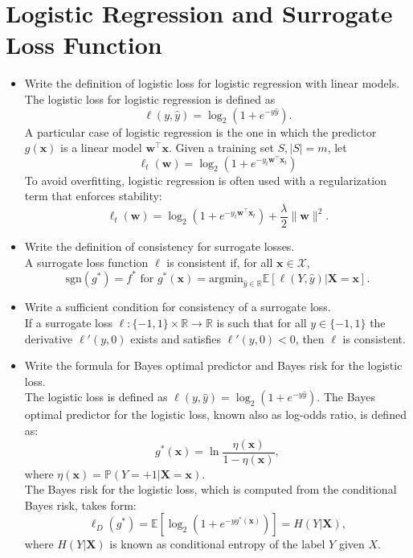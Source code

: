 \newpage
\section{Logistic Regression and Surrogate Loss Function}

\begin{itemize}

    \item Write the definition of logistic loss for logistic regression with linear models.\\

        The logistic loss for logistic regression is defined as
        $$\ell(y, \hat{y}) = \log_2 (1+e^{-y\hat{y}}).$$
        A particular case of logistic regression is the one in which the predictor $g(\boldsymbol{x})$ is a linear model $\boldsymbol{w}^\top \boldsymbol{x}$. Given a training set $S, |S|=m$, let 
        $$\ell_t (\boldsymbol{w}) = \log_2 (1+e^{-y_t \boldsymbol{w}^\top \boldsymbol{x}_t})$$
        To avoid overfitting, logistic regression is often used with a regularization term that enforces stability:
        $$\ell_t (\boldsymbol{w}) = \log_2 (1+e^{-y_t \boldsymbol{w}^\top \boldsymbol{x}_t}) + \frac{\lambda}{2} \|\boldsymbol{w}\|^2.$$

  \item Write the definition of consistency for surrogate losses.\\

        A surrogate loss function $\ell$ is consistent if, for all $\boldsymbol{x} \in \mathcal{X}$,
        $$\text{sgn} (g^*) = f^* \text{ for } g^*(\boldsymbol{x}) = \text{argmin}_{\hat{y} \in \mathbb{R}} \mathbb{E}[\ell(Y,\hat{y})|\boldsymbol{X} = \boldsymbol{x}].$$

  \item Write a sufficient condition for consistency of a surrogate loss.\\

        If a surrogate loss $\ell:\{-1,1\} \times \mathbb{R} \to \mathbb{R}$ is such that for all $y \in \{-1,1\}$ the derivative $\ell'(y,0)$ exists and satisfies $\ell'(y,0) < 0$, then $\ell$ is consistent.

  \item Write the formula for Bayes optimal predictor and Bayes risk for the logistic loss.\\

        The logistic loss is defined as $\ell(y, \hat{y}) = \log_2 (1 + e^{-y\hat{y}})$. The Bayes optimal predictor for the logistic loss, known also as log-odds ratio, is defined as:
        $$g^*(\boldsymbol{x}) = \ln \frac{\eta(\boldsymbol{x})}{1-\eta(\boldsymbol{x})},$$
        where $\eta(\boldsymbol{x}) = \mathbb{P} (Y=+1|\boldsymbol{X} = \boldsymbol{x})$.\\
        The Bayes risk for the logistic loss, which is computed from the conditional Bayes risk, takes form:
        $$\ell_D (g^*) = \mathbb{E}[\log_2(1+e^{-yg^*(\boldsymbol{x})})] = H(Y|\boldsymbol{X}),$$
        where $H(Y|\boldsymbol{X})$ is known as conditional entropy of the label $Y$ given $X$.

\end{itemize}
